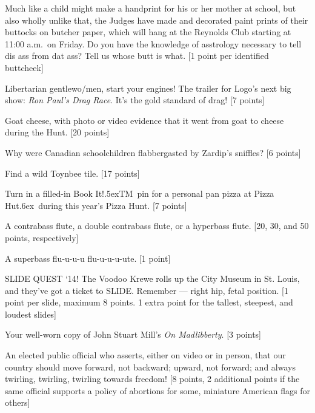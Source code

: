 \documentclass{book}
\def\tm{\raise.5ex\hbox{\scriptsize TM}}
\def\tr{\raise.6ex\hbox{\scriptsize \textregistered}}
\begin{document}
\begin{list}{}{}

\item \label{buttprints} Much like a child might make a handprint for his or her mother at school, but also wholly unlike that, the Judges have made and decorated paint prints of their buttocks on butcher paper, which will hang at the Reynolds Club starting at 11:00 a.m.\ on Friday. Do you have the knowledge of asstrology necessary to tell dis ass from dat ass? Tell us whose butt is what. [1 point per identified buttcheek]

\item Libertarian gentlewo/men, start your engines! The trailer for Logo's next big show: \emph{Ron Paul's Drag Race}. It's the gold standard of drag! [7 points]

\item Goat cheese, with photo or video evidence that it went from goat to cheese during the Hunt. [20 points]

\item Why were Canadian schoolchildren flabbergasted by Zardip's sniffles? [6 points]

\item Find a wild Toynbee tile. [17 points]

\item Turn in a filled-in Book It!\tm\ pin for a personal pan pizza at Pizza Hut\tr\ during this year's Pizza Hunt. [7 points]

\item  A contrabass flute, a double contrabass flute, or a hyperbass flute. [20, 30, and 50 points, respectively] 

\item A superbass flu-u-u-u flu-u-u-u-ute. [1 point] 

\item  SLIDE QUEST `14! The Voodoo Krewe rolls up the City Museum in St. Louis, and they've got a ticket to SLIDE. Remember --- right hip, fetal position. [1 point per slide, maximum 8 points. 1 extra point for the tallest, steepest, and loudest slides]

\item Your well-worn copy of John Stuart Mill's \emph{On Madlibberty}. [3 points]

\item An elected public official who asserts, either on video or in person, that our country should move forward, not backward; upward, not forward; and always twirling, twirling, twirling towards freedom! [8 points, 2 additional points if the same official supports a policy of abortions for some, miniature American flags for others]


\end{list}
\end{document}
